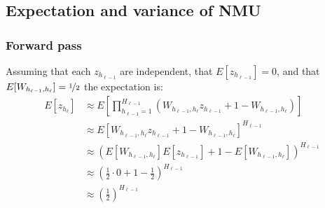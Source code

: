 \subsection{Expectation and variance of NMU}

\subsubsection{Forward pass}

Assuming that each $z_{h_{\ell-1}}$ are independent, that $E[z_{h_{\ell-1}}] = 0$, and that $E[W_{h_{\ell-1},h_\ell}] = \nicefrac{1}{2}$ the expectation is:
\begin{equation}
\begin{aligned}
E[z_{h_\ell}] &\approx E\left[\prod_{h_{\ell-1}=1}^{H_{\ell-1}} \left(W_{h_{\ell-1},h_\ell} z_{h_{\ell-1}} + 1 - W_{h_{\ell-1},h_\ell} \right)\right] \\
&\approx E\left[W_{h_{\ell-1},h_\ell} z_{h_{\ell-1}} + 1 - W_{h_{\ell-1},h_\ell} \right]^{H_{\ell-1}} \\
&\approx \left(E[W_{h_{\ell-1},h_\ell}] E[z_{h_{\ell-1}}] + 1 - E[W_{h_{\ell-1},h_\ell}] \right)^{H_{\ell-1}} \\
&\approx\left(\frac{1}{2}\cdot0 + 1 - \frac{1}{2}\right)^{H_{\ell-1}} \\
&\approx\left(\frac{1}{2}\right)^{H_{\ell-1}}
\end{aligned}
\end{equation}

